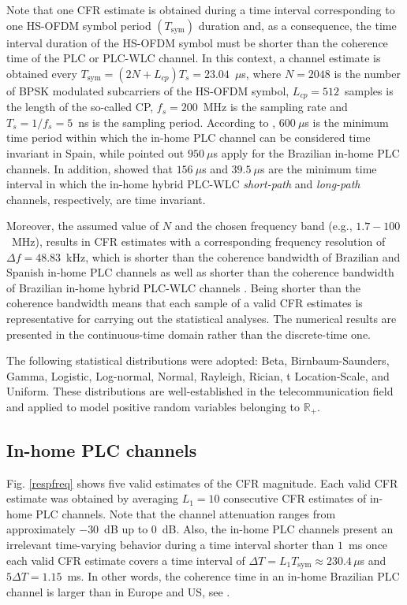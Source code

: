 \documentclass[journal]{IEEEtran}
\begin{document}
Note that one \ac{CFR} estimate is obtained during a time interval corresponding to one \ac{HS-OFDM} symbol period $(T_{\textrm{sym}})$ duration and, as a consequence, the time interval duration of the \ac{HS-OFDM} symbol must be shorter than the coherence time of the \ac{PLC} or \ac{PLC}-\ac{WLC} channel. In this context, a channel estimate is obtained every $T_{\textrm{sym}}=(2N + L_{cp}) T_s = 23.04$~$\mu$s, where $N=2048$ is the number of \ac{BPSK} modulated subcarriers of the \ac{HS-OFDM} symbol, $L_{cp}=512$~samples is the length of the so-called \ac{CP}, $f_s=200$~MHz is the sampling rate and $T_s=1/f_s=5$~ns is the sampling period. According to \cite{Canete:AIPLC}, $600~\mu$s is the minimum time period within which the in-home \ac{PLC} channel can be considered time invariant in Spain, while \cite{Thiago:Characterization} pointed out $950~\mu$s apply for the Brazilian in-home \ac{PLC} channels. In addition, \cite{thiago:hyb} showed that  $156~\mu$s and $39.5~\mu$s are the minimum time interval in which the in-home hybrid \ac{PLC}-\ac{WLC} \textit{short-path} and \textit{long-path} channels, respectively, are time invariant.

Moreover, the assumed value of $N$ and the chosen frequency band (e.g., $1.7-100$~MHz), results in \ac{CFR} estimates with a corresponding frequency resolution of $\Delta f=48.83$~kHz, which is shorter than the coherence bandwidth of Brazilian and Spanish in-home \ac{PLC} channels \cite{Canete:AIPLC,Thiago:Characterization} as well as shorter than the coherence bandwidth of Brazilian in-home hybrid \ac{PLC}-\ac{WLC} channels \cite{thiago:hyb}. Being shorter than the coherence bandwidth means that each sample of a valid \ac{CFR} estimates is representative for carrying out the statistical analyses. The numerical results are presented in the continuous-time domain rather than the discrete-time one.

The following statistical distributions were adopted: Beta, Birnbaum-Saunders, Gamma, Logistic, Log-normal, Normal, Rayleigh, Rician, t Location-Scale, and Uniform. These distributions are well-established in the telecommunication field and applied to model positive random variables belonging to $\mathbb{R}_+$.

\subsection{In-home PLC channels}\label{sec:MMPLC}

Fig. \ref{respfreq} shows five valid estimates of the \ac{CFR} magnitude. Each valid \ac{CFR} estimate was obtained by averaging  $L_1 = 10$ consecutive \ac{CFR} estimates of in-home \ac{PLC} channels. Note that the channel attenuation ranges from approximately $-30$~dB up to $0$~dB. Also, the in-home \ac{PLC} channels present an irrelevant time-varying behavior during a time interval shorter than $1$~ms once each valid \ac{CFR} estimate covers a time interval of $\Delta T = L_1 T_{\textrm{sym}} \approx 230.4\,\mu$s and $5\Delta T = 1.15$~ms. In other words, the coherence time in an in-home Brazilian PLC channel is larger than in Europe and US, see \cite{Thiago:Characterization}.
\end{document}
